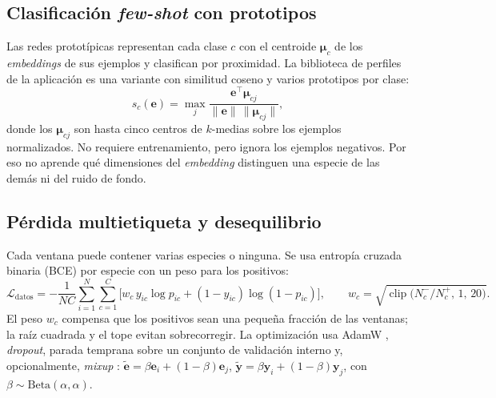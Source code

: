 \documentclass[11pt,a4paper]{article}
\begin{document}
\subsection{Clasificación \emph{few-shot} con prototipos}
Las redes prototípicas \citep{snell2017prototypical} representan cada clase $c$ con el centroide $\boldsymbol{\mu}_c$ de los \emph{embeddings}
de sus ejemplos y clasifican por proximidad. La biblioteca de perfiles de la aplicación es una variante con similitud coseno y varios prototipos
por clase:
\begin{equation}
  s_c(\mathbf{e}) = \max_{j} \frac{\mathbf{e}^\top \boldsymbol{\mu}_{cj}}{\|\mathbf{e}\|\,\|\boldsymbol{\mu}_{cj}\|},
\end{equation}
donde los $\boldsymbol{\mu}_{cj}$ son hasta cinco centros de $k$-medias sobre los ejemplos normalizados. No requiere entrenamiento, pero ignora los
ejemplos negativos. Por eso no aprende qué dimensiones del \emph{embedding} distinguen una especie de las demás ni del ruido de fondo.

\subsection{Pérdida multietiqueta y desequilibrio}
Cada ventana puede contener varias especies o ninguna. Se usa entropía cruzada binaria (BCE) por especie con un peso para los positivos:
\begin{equation}
  \mathcal{L}_{\text{datos}} = -\frac{1}{NC}\sum_{i=1}^{N}\sum_{c=1}^{C} \Big[ w_c\, y_{ic} \log p_{ic} + (1 - y_{ic}) \log (1 - p_{ic}) \Big],
  \qquad w_c = \sqrt{\operatorname{clip}\!\big(N^-_c / N^+_c,\, 1,\, 20\big)} .
\end{equation}
El peso $w_c$ compensa que los positivos sean una pequeña fracción de las ventanas; la raíz cuadrada y el tope evitan sobrecorregir.
La optimización usa AdamW \citep{kingma2015adam,loshchilov2019adamw}, \emph{dropout}, parada temprana sobre un conjunto de validación interno
y, opcionalmente, \emph{mixup} \citep{zhang2018mixup}: $\tilde{\mathbf{e}} = \beta \mathbf{e}_i + (1-\beta)\mathbf{e}_j$,
$\tilde{\mathbf{y}} = \beta \mathbf{y}_i + (1-\beta)\mathbf{y}_j$, con $\beta \sim \mathrm{Beta}(\alpha,\alpha)$.
\end{document}
